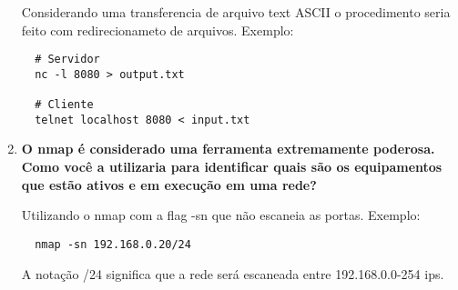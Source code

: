 \begin{enumerate}
  Considerando uma transferencia de arquivo text ASCII o procedimento seria feito com redirecionameto
  de arquivos. Exemplo:

  \lstset{style=basic}
  \begin{lstlisting}
  # Servidor
  nc -l 8080 > output.txt

  # Cliente
  telnet localhost 8080 < input.txt

  \end{lstlisting}
  \item \textbf{O nmap é considerado uma ferramenta extremamente poderosa. Como você a utilizaria para
    identificar quais são os equipamentos que estão ativos e em execução em uma rede?}

  Utilizando o nmap com a flag -sn que não escaneia as portas. Exemplo:

  \lstset{style=basic}
  \begin{lstlisting}
  nmap -sn 192.168.0.20/24
  \end{lstlisting}
  
  A notação /24 significa que a rede será escaneada entre 192.168.0.0-254 ips.
\end{enumerate}
